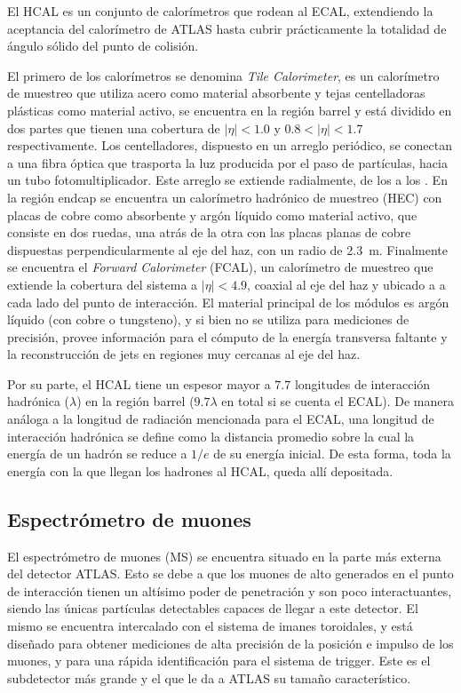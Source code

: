 El HCAL es un conjunto de calorímetros que rodean al ECAL, extendiendo la aceptancia del calorímetro de ATLAS hasta cubrir prácticamente la totalidad de ángulo sólido del punto de colisión.

El primero de los calorímetros se denomina \textit{Tile Calorimeter}, es un calorímetro de muestreo que utiliza acero como material absorbente y tejas centelladoras plásticas como material activo, se encuentra en la región barrel y está dividido en dos partes que tienen una cobertura de $|\eta|<1.0$ y $0.8<|\eta|<1.7$ respectivamente. Los centelladores, dispuesto en un arreglo
periódico, se conectan a una fibra óptica que trasporta la luz producida por el paso
de partículas, hacia un tubo fotomultiplicador. Este arreglo se extiende radialmente, de los
 a los . 
En la región endcap se encuentra un calorímetro hadrónico de muestreo (HEC) con placas de cobre como absorbente y argón líquido como material activo, que consiste en dos ruedas, una atrás de la otra con las placas planas de cobre dispuestas perpendicularmente al eje del haz, con un radio de 2.3\ m. Finalmente se encuentra el \textit{Forward Calorimeter} (FCAL), un calorímetro de muestreo que extiende la cobertura del sistema a $|\eta|<4.9$, coaxial
al eje del haz y ubicado a  a cada lado del punto de interacción. El material
principal de los módulos es argón líquido (con cobre o tungsteno), y si bien no se
utiliza para mediciones de precisión, provee información para el cómputo de la energía transversa faltante y la reconstrucción de jets en regiones muy cercanas al eje
del haz.



Por su parte, el HCAL tiene un espesor mayor a $7.7$ longitudes de interacción
hadrónica ($\lambda$) en la región barrel ($9.7\lambda$ en total si se cuenta el ECAL). De manera
análoga a la longitud de radiación mencionada para el ECAL, una longitud de
interacción hadrónica se define como la distancia promedio sobre la cual la energía
de un hadrón se reduce a $1/e$ de su energía inicial. De esta forma, toda la energía
con la que llegan los hadrones al HCAL, queda allí depositada.

\subsection{Espectrómetro de muones}

El espectrómetro de muones (MS) se encuentra situado en la parte más externa del detector ATLAS. Esto se debe a que los muones de alto \pt generados en el punto de interacción tienen un altísimo poder de penetración y son poco interactuantes, siendo las únicas partículas detectables capaces de llegar a este detector. El mismo se encuentra intercalado con el sistema de imanes toroidales, y está diseñado para obtener mediciones de alta precisión de la posición e impulso de los muones, y para una rápida identificación para el sistema de trigger. Este es el subdetector más grande y el que le da a ATLAS su tamaño característico. 

